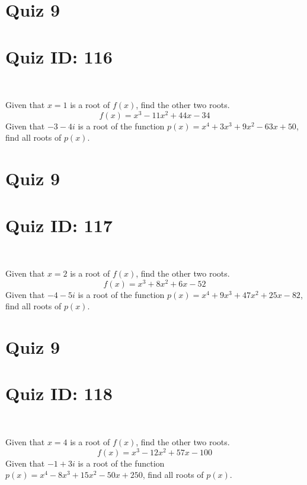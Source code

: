 \documentclass{exam}
\begin{document}
\section*{Quiz 9}
\section*{Quiz ID: 116}
\vspace{0.5cm}\
\vspace{1cm}\
\begin{questions}
\question Given that $x=1$ is a root of $f(x)$, find the other two roots.\[f(x)=
x^3 - 11x^2 + 44x - 34\]
\newpage
\question Given that $-3-4\mathit{i}$ is a root of the function $p(x)=
x^4 + 3x^3 + 9x^2 - 63x + 50$, find all roots of $p(x)$. 
\end{questions}\newpage
\newpage
\section*{Quiz 9}
\section*{Quiz ID: 117}
\vspace{0.5cm}\
\vspace{1cm}\
\begin{questions}
\question Given that $x=2$ is a root of $f(x)$, find the other two roots.\[f(x)=
x^3 + 8x^2 + 6x - 52\]
\newpage
\question Given that $-4-5\mathit{i}$ is a root of the function $p(x)=
x^4 + 9x^3 + 47x^2 + 25x - 82$, find all roots of $p(x)$. \makeemptybox{\stretch{1}}
\end{questions}\newpage
\newpage
\section*{Quiz 9}
\section*{Quiz ID: 118}
\vspace{0.5cm}\
\vspace{1cm}\
\begin{questions}
\question Given that $x=4$ is a root of $f(x)$, find the other two roots.\[f(x)=
x^3 - 12x^2 + 57x - 100\]
\newpage
\question Given that $-1+3\mathit{i}$ is a root of the function $p(x)=
x^4 - 8x^3 + 15x^2 - 50x + 250$, find all roots of $p(x)$. \makeemptybox{\stretch{1}}
\end{questions}\newpage
\newpage
\end{document}
